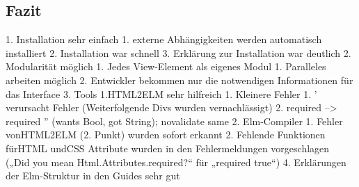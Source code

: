 \subsection{Fazit}
\label{sec:Fazit}

  
1. Installation sehr einfach
1. externe Abhängigkeiten werden automatisch installiert
2. Installation war schnell
3. Erklärung zur Installation war deutlich
2. Modularität möglich
1. Jedes View-Element als eigenes Modul
1. Paralleles arbeiten möglich
2. Entwickler bekommen nur die notwendigen Informationen für das Interface
3. Tools
1.\ac{HTML}2ELM sehr hilfreich
1. Kleinere Fehler
1. ' verursacht Fehler (Weiterfolgende Divs wurden vernachlässigt)
2. required --> required '' (wants Bool, got String); novalidate same
2. Elm-Compiler
1. Fehler von\ac{HTML}2ELM (2. Punkt) wurden sofort erkannt
2. Fehlende Funktionen für\ac{HTML} und\ac{CSS} Attribute wurden in den Fehlermeldungen vorgeschlagen („Did you mean Html.Attributes.required?“ für „required true“)
4. Erklärungen der Elm-Struktur in den Guides sehr gut